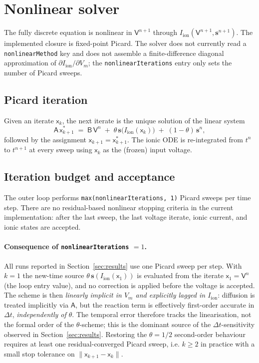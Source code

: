 \documentclass[11pt,a4paper]{article}
\newcommand{\Vm}{V_{m}}
\newcommand{\Iion}{I_{\text{ion}}}
\newcommand{\Aimp}{\mathsf{A}}
\newcommand{\Bimp}{\mathsf{B}}
\newcommand{\code}[1]{\texttt{\small #1}}
\begin{document}
\section{Nonlinear solver}
\label{sec:nonlinear}

The fully discrete equation is nonlinear in $\mathsf{V}^{n+1}$ through
$\Iion(\mathsf{V}^{n+1}, \mathbf{s}^{n+1})$. The implemented closure is
fixed-point Picard. The solver does not currently read a
\code{nonlinearMethod} key and does not assemble a finite-difference
diagonal approximation of $\partial\Iion/\partial\Vm$; the
\code{nonlinearIterations} entry only sets the number of Picard sweeps.

\subsection{Picard iteration}

Given an iterate $\mathsf{x}_{k}$, the next iterate is the unique
solution of the linear system
\begin{equation}
  \Aimp\, \mathsf{x}_{k+1}^{\ast}
   \;=\;
   \Bimp\, \mathsf{V}^{n}
   \;+\;
   \theta\, \mathbf{s}\!\bigl(\Iion(\mathsf{x}_{k})\bigr)
   \;+\;
   (1-\theta)\, \mathbf{s}^{n},
\end{equation}
followed by the assignment
$\mathsf{x}_{k+1} = \mathsf{x}_{k+1}^{\ast}$. The ionic ODE is
re-integrated from $t^{n}$ to $t^{n+1}$ at every sweep using
$\mathsf{x}_{k}$ as the (frozen) input voltage.

\subsection{Iteration budget and acceptance}

The outer loop performs \code{max(nonlinearIterations, 1)} Picard
sweeps per time step. There are no residual-based nonlinear stopping
criteria in the current implementation: after the last sweep, the last
voltage iterate, ionic current, and ionic states are accepted.

\paragraph{Consequence of \code{nonlinearIterations} $= 1$.}
All runs reported in Section~\ref{sec:results} use one Picard sweep
per step. With $k=1$ the new-time source $\theta\,\mathbf{s}(\Iion
(\mathsf{x}_{1}))$ is evaluated from the iterate
$\mathsf{x}_{1} = \mathsf{V}^{n}$ (the loop entry value), and no
correction is applied before the voltage is accepted. The scheme is
then \emph{linearly implicit in $\Vm$ and explicitly lagged in
$\Iion$}: diffusion is treated implicitly via $\Aimp$, but the
reaction term is effectively first-order accurate in $\Delta t$,
\emph{independently of $\theta$}. The temporal error therefore tracks
the linearisation, not the formal order of the $\theta$-scheme; this
is the dominant source of the $\Delta t$-sensitivity observed in
Section~\ref{sec:results}. Restoring the $\theta = 1/2$ second-order
behaviour requires at least one residual-converged Picard sweep, i.e.
$k \ge 2$ in practice with a small stop tolerance on
$\|\mathsf{x}_{k+1} - \mathsf{x}_{k}\|$.
\end{document}
